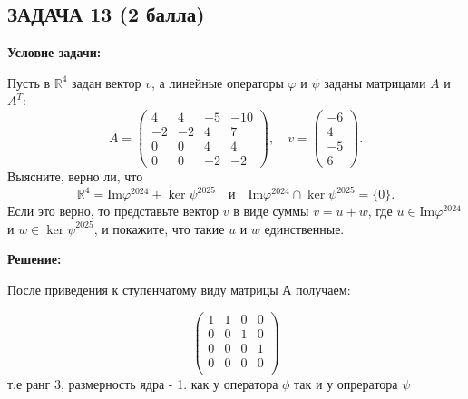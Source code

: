 \documentclass[a4paper,12pt]{article}
\begin{document}
\subsection{ЗАДАЧА 13 \hfill \textbf{(2 балла)}}
\textbf{Условие задачи:}

Пусть в \( \mathbb{R}^4 \) задан вектор \( v \), а линейные операторы \( \varphi \) и \( \psi \) заданы матрицами \( A \) и \( A^T \):
\[
A =
\begin{pmatrix}
4 & 4 & -5 & -10 \\
-2 & -2 & 4 & 7 \\
0 & 0 & 4 & 4 \\
0 & 0 & -2 & -2
\end{pmatrix},
\quad
v =
\begin{pmatrix}
-6 \\
4 \\
-5 \\
6
\end{pmatrix}.
\]
Выясните, верно ли, что
\[
\mathbb{R}^4 = \text{Im} \varphi^{2024} + \ker \psi^{2025} \quad \text{и} \quad \text{Im} \varphi^{2024} \cap \ker \psi^{2025} = \{0\}.
\]
Если это верно, то представьте вектор \( v \) в виде суммы \( v = u + w \), где \( u \in \text{Im} \varphi^{2024} \) и \( w \in \ker \psi^{2025} \), и покажите, что такие \( u \) и \( w \) единственные.

\textbf{Решение:}

После приведения к ступенчатому виду матрицы А получаем:

\[
\begin{pmatrix}
    1&1 & 0& 0\\
    0& 0& 1& 0\\
    0& 0& 0& 1\\
    0& 0& 0& 0\\
\end{pmatrix}
\]
т.е ранг 3, размерность ядра - 1.  как у оператора $\phi $ так и у опрератора $\psi$


\vspace{1cm}
\end{document}

